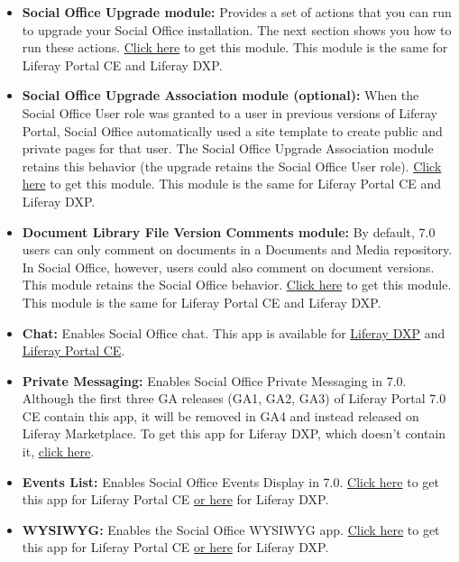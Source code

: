 \begin{itemize}
\item
  \textbf{Social Office Upgrade module:} Provides a set of actions that
  you can run to upgrade your Social Office installation. The next
  section shows you how to run these actions.
  \href{https://repository.liferay.com/nexus/content/repositories/liferay-public-releases/com/liferay/com.liferay.social.office.upgrade/}{Click
  here} to get this module. This module is the same for Liferay Portal
  CE and Liferay DXP.
\item
  \textbf{Social Office Upgrade Association module (optional):} When the
  Social Office User role was granted to a user in previous versions of
  Liferay Portal, Social Office automatically used a site template to
  create public and private pages for that user. The Social Office
  Upgrade Association module retains this behavior (the upgrade retains
  the Social Office User role).
  \href{https://repository.liferay.com/nexus/content/repositories/liferay-public-releases/com/liferay/com.liferay.social.office.upgrade.association/}{Click
  here} to get this module. This module is the same for Liferay Portal
  CE and Liferay DXP.
\item
  \textbf{Document Library File Version Comments module:} By default,
  7.0 users can only comment on documents in a Documents and Media
  repository. In Social Office, however, users could also comment on
  document versions. This module retains the Social Office behavior.
  \href{https://repository.liferay.com/nexus/content/repositories/liferay-public-releases/com/liferay/com.liferay.document.library.file.version.discussion.web/}{Click
  here} to get this module. This module is the same for Liferay Portal
  CE and Liferay DXP.
\item
  \textbf{Chat:} Enables Social Office chat. This app is available for
  \href{https://web.liferay.com/marketplace/-/mp/application/15184463}{Liferay
  DXP} and
  \href{https://web.liferay.com/marketplace/-/mp/application/15392476}{Liferay
  Portal CE}.
\item
  \textbf{Private Messaging:} Enables Social Office Private Messaging in
  7.0. Although the first three GA releases (GA1, GA2, GA3) of Liferay
  Portal 7.0 CE contain this app, it will be removed in GA4 and instead
  released on Liferay Marketplace. To get this app for Liferay DXP,
  which doesn't contain it,
  \href{https://web.liferay.com/marketplace/-/mp/application/83559411}{click
  here}.
\item
  \textbf{Events List:} Enables Social Office Events Display in 7.0.
  \href{https://web.liferay.com/marketplace/-/mp/application/83511066}{Click
  here} to get this app for Liferay Portal CE
  \href{https://web.liferay.com/marketplace/-/mp/application/83511153}{or
  here} for Liferay DXP.
\item
  \textbf{WYSIWYG:} Enables the Social Office WYSIWYG app.
  \href{https://web.liferay.com/marketplace/-/mp/application/15502123}{Click
  here} to get this app for Liferay Portal CE
  \href{https://web.liferay.com/marketplace/-/mp/application/15503342}{or
  here} for Liferay DXP.
\end{itemize}

